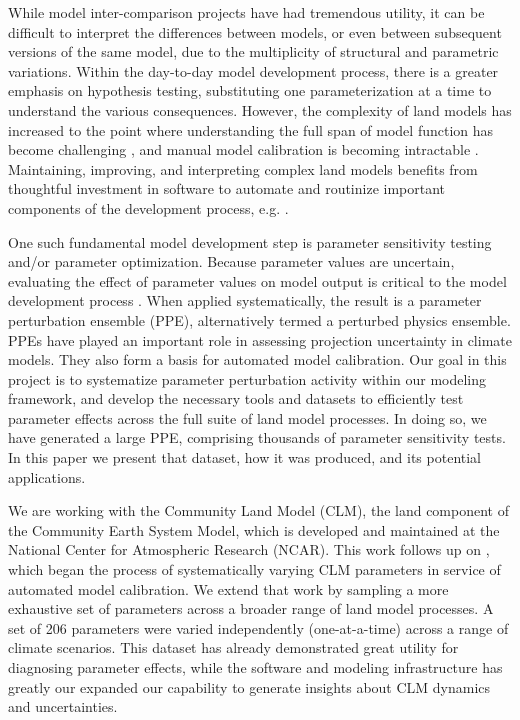 \documentclass[draft]{agujournal2019}
\begin{document}
While model inter-comparison projects have had tremendous utility, it can be difficult to interpret the differences between models, or even between subsequent versions of the same model, due to the multiplicity of structural and parametric variations.
Within the day-to-day model development process, there is a greater emphasis on hypothesis testing, substituting one parameterization at a time to understand the various consequences.
However, the complexity of land models has increased to the point where understanding the full span of model function has become challenging \cite{fisher2020}, and manual model calibration is becoming intractable \cite{dagon2020}.
Maintaining, improving, and interpreting complex land models benefits from thoughtful investment in software to automate and routinize important components of the development process, e.g. . 

One such fundamental model development step is parameter sensitivity testing and/or parameter optimization.
Because parameter values are uncertain, evaluating the effect of parameter values on model output is critical to the model development process \cite{hourdin2017}.
When applied systematically, the result is a parameter perturbation ensemble (PPE), alternatively termed a perturbed physics ensemble.
PPEs have played an important role in assessing projection uncertainty in climate models.
They also form a basis for automated model calibration.
Our goal in this project is to systematize parameter perturbation activity within our modeling framework, and develop the necessary tools and datasets to efficiently test parameter effects across the full suite of land model processes. 
In doing so, we have generated a large PPE, comprising thousands of parameter sensitivity tests.
In this paper we present that dataset, how it was produced, and its potential applications.

We are working with the Community Land Model (CLM), the land component of the Community Earth System Model, which is developed and maintained at the National Center for Atmospheric Research (NCAR).
This work follows up on , which began the process of systematically varying CLM parameters in service of automated model calibration.
We extend that work by sampling a more exhaustive set of parameters across a broader range of land model processes.
A set of 206 parameters were varied independently (one-at-a-time) across a range of climate scenarios.
This dataset has already demonstrated great utility for diagnosing parameter effects, while the software and modeling infrastructure has greatly our expanded our capability to generate insights about CLM dynamics and uncertainties.
\end{document}
